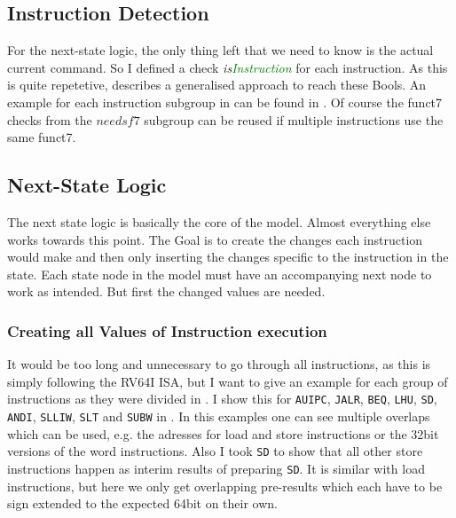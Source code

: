\subsection{Instruction Detection}

For the next-state logic, the only thing left that we need to know is
the actual current command. So I defined a check
\textsl{is\textcolor{Green}{Instruction}} for each instruction. As
this is quite repetetive,  describes a
generalised approach to reach these Bools. An example for each
instruction subgroup in  can be found
in . Of course the funct7 checks from
the $needsf7$ subgroup can be reused if multiple instructions use the
same funct7.




\subsection{Next-State Logic}
The next state logic is basically the core of the model. Almost
everything else works towards this point. The Goal is to create the
changes each instruction would make and then only inserting the
changes specific to the instruction in the state. Each state node in
the model must have an accompanying next node to work as intended.
But first the changed values are needed.

\subsubsection{Creating all Values of Instruction execution}
It would be too long and unnecessary to go through all instructions,
as this is simply following the RV64I ISA, but I want to give an
example for each group of instructions as they were divided in
. I show this for \texttt{AUIPC},
\texttt{JALR}, \texttt{BEQ}, \texttt{LHU}, \texttt{SD},
\texttt{ANDI}, \texttt{SLLIW}, \texttt{SLT} and \texttt{SUBW} in
. In this examples one can see multiple
overlaps which can be used, e.g. the adresses for load and store
instructions or the 32bit versions of the word instructions. Also I
took \texttt{SD} to show that all other store instructions happen as
interim results of preparing \texttt{SD}. It is similar with load
instructions, but here we only get overlapping pre-results which each
have to be sign extended to the expected 64bit on their own.

